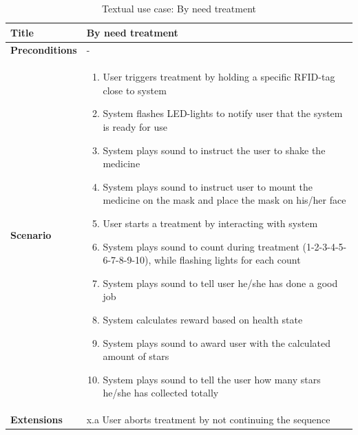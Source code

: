 \begin{table}[H]
\begin{tabular}{|p{4.0cm} | p{9.0cm} |}
\hline
\textbf{Title} & By need treatment \\
\hline
\textbf{Preconditions} & - \\
\hline 
\textbf{Scenario} & 
	\begin{enumerate}
	  \item User triggers treatment by holding a specific RFID-tag close to system
	  \item System flashes LED-lights to notify user that the system is ready for use
	  \item System plays sound to instruct the user to shake the medicine
	  \item System plays sound to instruct user to mount the medicine on the mask and place the mask on his/her face
	  \item User starts a treatment by interacting with system
	  \item System plays sound to count during treatment (1-2-3-4-5-6-7-8-9-10), while flashing lights for each count
	  \item System plays sound to tell user he/she has done a good job
	  \item System calculates reward based on health state
	  \item System plays sound to award user with the calculated amount of stars
	  \item System plays sound to tell the user how many stars he/she has collected totally
	\end{enumerate}
\\
\hline
	\textbf{Extensions} & 
		x.a User aborts treatment by not continuing the sequence
\\
\hline
\end{tabular}
\caption{Textual use case: By need treatment}
\label{tab:textual-use-case}
\end{table}



